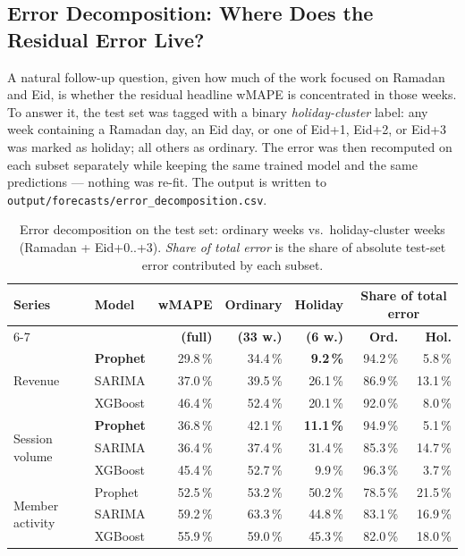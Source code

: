 \subsection{Error Decomposition: Where Does the Residual Error Live?}

A natural follow-up question, given how much of the work focused on Ramadan
and Eid, is whether the residual headline wMAPE is concentrated in those
weeks. To answer it, the test set was tagged with a binary
\textit{holiday-cluster} label: any week containing a Ramadan day, an Eid day,
or one of Eid+1, Eid+2, or Eid+3 was marked as holiday; all others as
ordinary. The error was then recomputed on each subset separately while
keeping the same trained model and the same predictions --- nothing was
re-fit. The output is written to
\texttt{output/forecasts/error\_decomposition.csv}.

\begin{table}[H]
  \centering
  \caption{Error decomposition on the test set: ordinary weeks vs.\ holiday-cluster
           weeks (Ramadan + Eid+0..+3). \emph{Share of total error} is the
           share of absolute test-set error contributed by each
           subset.\label{tab:error_decomposition}}
  \begin{tabular}{llrrrrr}
    \toprule
    \textbf{Series} & \textbf{Model} &
    \textbf{wMAPE} & \textbf{Ordinary} & \textbf{Holiday} &
    \multicolumn{2}{c}{\textbf{Share of total error}} \\
    \cmidrule(lr){6-7}
    & & \textbf{(full)} & \textbf{(33 w.)} & \textbf{(6 w.)} &
    \textbf{Ord.} & \textbf{Hol.} \\
    \midrule
    \multirow{3}{*}{Revenue}
      & \textbf{Prophet} & 29.8\,\% & 34.4\,\% & \textbf{9.2\,\%}  & 94.2\,\% & 5.8\,\% \\
      & SARIMA           & 37.0\,\% & 39.5\,\% & 26.1\,\% & 86.9\,\% & 13.1\,\% \\
      & XGBoost          & 46.4\,\% & 52.4\,\% & 20.1\,\% & 92.0\,\% & 8.0\,\% \\
    \midrule
    \multirow{3}{*}{Session volume}
      & \textbf{Prophet} & 36.8\,\% & 42.1\,\% & \textbf{11.1\,\%} & 94.9\,\% & 5.1\,\% \\
      & SARIMA           & 36.4\,\% & 37.4\,\% & 31.4\,\% & 85.3\,\% & 14.7\,\% \\
      & XGBoost          & 45.4\,\% & 52.7\,\% &  9.9\,\% & 96.3\,\% & 3.7\,\% \\
    \midrule
    \multirow{3}{*}{Member activity}
      & Prophet & 52.5\,\% & 53.2\,\% & 50.2\,\% & 78.5\,\% & 21.5\,\% \\
      & SARIMA  & 59.2\,\% & 63.3\,\% & 44.8\,\% & 83.1\,\% & 16.9\,\% \\
      & XGBoost & 55.9\,\% & 59.0\,\% & 45.3\,\% & 82.0\,\% & 18.0\,\% \\
    \bottomrule
  \end{tabular}
\end{table}


